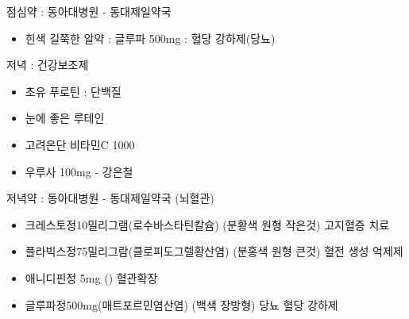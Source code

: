 \documentclass[aspectratio=1610,17pt,xcolor=pdftex,dvipsnames,table,handout]{beamer}
\begin{document}
		\begin{frame} [t,plain]

			\begin{block} { 점심약 : 동아대병원 - 동대제일약국 }
			\begin{itemize}
			\item 	힌색 길쭉한 알약 : 글루파 500mg : 혈당 강하제(당뇨)
			\end{itemize}
			\end{block}			

			\begin{block} { 저녁  :  건강보조제 }
			\begin{itemize}
			\item 	초유 푸로틴 : 단백질 
			\item 	눈에 좋은 루테인
			\item 	고려은단 비타민C 1000
			\item 	우루사 100mg - 강은철
			\end{itemize}
			\end{block}			

								
		\end{frame}	 %


		\begin{frame} [t,plain]

			\begin{block} { 저녁약 : 동아대병원 -  동대제일약국 (뇌혈관)}
			\begin{itemize}
			\item 	크레스토정10밀리그램(로수바스타틴칼슘)  (분황색 원형 작은것) 고지혈증 치료
			\item 	플라빅스정75밀리그람(클로피도그렐황산염)  (분홍색 원형 큰것) 혈전 생성 억제제
			\item 	애니디핀정 5mg () 혈관확장
			\item 	글루파정500mg(매트포르민염산염) (백색 장방형) 당뇨 혈당 강하제
			\end{itemize}
			\end{block}			


								
		\end{frame}	 %
\end{document}
